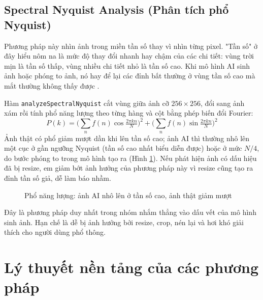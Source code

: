 \subsection{Spectral Nyquist Analysis (Phân tích phổ Nyquist)}
Phương pháp này nhìn ảnh trong miền tần số thay vì nhìn từng pixel. "Tần số" ở đây hiểu nôm na là mức độ thay đổi nhanh hay chậm của các chi tiết: vùng trời mịn là tần số thấp, vùng nhiều chi tiết nhỏ là tần số cao. Khi mô hình AI sinh ảnh hoặc phóng to ảnh, nó hay để lại các đỉnh bất thường ở vùng tần số cao mà mắt thường không thấy được \cite{durall2020,wang2020}.

Hàm \texttt{analyzeSpectralNyquist} cắt vùng giữa ảnh cỡ $256\times256$, đổi sang ảnh xám rồi tính phổ năng lượng theo từng hàng và cột bằng phép biến đổi Fourier:
\[
P(k)=\Big(\sum_{n} f(n)\cos\tfrac{2\pi kn}{N}\Big)^2+\Big(\sum_{n} f(n)\sin\tfrac{2\pi kn}{N}\Big)^2
\]
Ảnh thật có phổ giảm mượt dần khi lên tần số cao; ảnh AI thì thường nhô lên một cục ở gần ngưỡng Nyquist (tần số cao nhất biểu diễn được) hoặc ở mức $N/4$, do bước phóng to trong mô hình tạo ra (Hình \ref{fig:spectral-curve}). Nếu phát hiện ảnh có dấu hiệu đã bị resize, em giảm bớt ảnh hưởng của phương pháp này vì resize cũng tạo ra đỉnh tần số giả, dễ làm báo nhầm.

\begin{figure}[H]
\centering
{}
\caption{Phổ năng lượng: ảnh AI nhô lên ở tần số cao, ảnh thật giảm mượt}
\label{fig:spectral-curve}
\end{figure}

Đây là phương pháp duy nhất trong nhóm nhắm thẳng vào dấu vết của mô hình sinh ảnh. Hạn chế là dễ bị ảnh hưởng bởi resize, crop, nén lại và hơi khó giải thích cho người dùng phổ thông.

\section{Lý thuyết nền tảng của các phương pháp}

